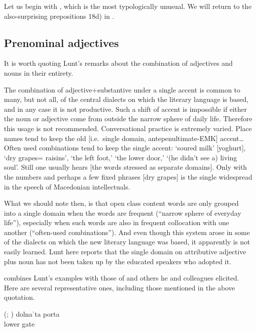 \documentclass[output=paper,
modfonts
]{LSP/langsci}
\begin{document}
\begin{exe}
\noindent Let us begin with , which is the most typologically unusual. We will return to the also-surprising prepositions 18d) in . 

\subsection[Prenominal adjectives ]{Prenominal adjectives}\label{sec:kaisse:4.2}

It is worth quoting Lunt’s remarks about the combination of adjectives and nouns in their entirety. 

\begin{indentquote}
The combination of adjective+substantive under a single accent is common to many, but not all, of the central dialects on which the literary language is based, and in any case it is not productive. Such a shift of accent is impossible if either the noun or adjective come from outside the narrow sphere of daily life. Therefore this usage is not recommended. Conversational practice is extremely varied. Place names tend to keep the old [i.e.\ single domain, antepenultimate-EMK] accent… Often used combinations tend to keep the single accent: ‘soured milk’ [yoghurt], ‘dry grapes= raisins’, ‘the left foot,' ‘the lower door,' ‘(he didn’t see a) living soul’. Still one usually hears [the words stressed as separate domains]. Only with the numbers and perhaps a few fixed phrases [dry grapes] is the single  widespread in the speech of Macedonian intellectuals. \citep[24--25]{lunt1952}
\end{indentquote}
What we should note then, is that open class content words are only grouped into a single  domain when the words are frequent (“narrow sphere of everyday life”), especially when such words are also in frequent collocation with one another (“often-used combinations”). And even though this system arose in some of the dialects on which the new literary language was based, it apparently is not easily learned. Lunt here reports that the single domain  on attributive adjective plus noun has not been taken up by the educated speakers who adopted it. 

\citet{franks1987,franks1989} combines Lunt’s examples with those of \citet{koneski1976} and others he and colleagues elicited. Here are several representative ones, including those mentioned in the above quotation.

\ea \label{ex:kaisse:19}  (\citealt{lunt1952}; \citealt[989]{franks1987})
	\ea \label{ex:kaisse:19a} \gll dolnaˈta porta\\
	lower gate\\
	

\end{exe}
\end{document}
